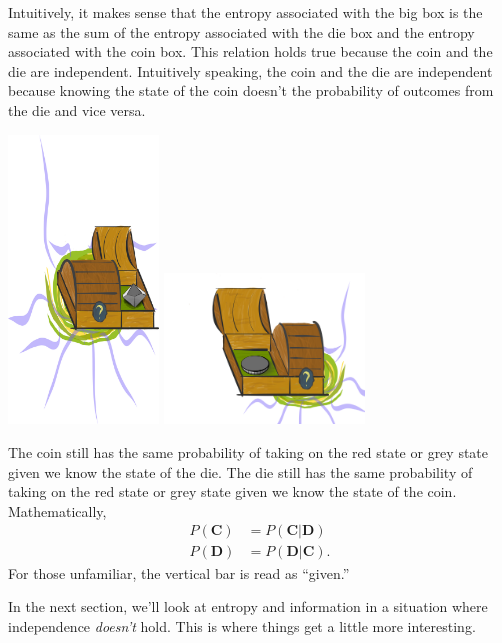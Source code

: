 Intuitively, it makes sense that the entropy associated with the big box is the same as the sum of the entropy associated with the die box and the entropy associated with the coin box.
This relation holds true because the coin and the die are independent.
Intuitively speaking, the coin and the die are independent because knowing the state of the coin doesn't the probability of outcomes from the die and vice versa.
\begin{center}

\includegraphics[width=0.3\textwidth]{img/left-box-closed-portal-die}
\includegraphics[trim= 0 -200ex 0 0, clip,width=0.4\textwidth]{img/right-box-closed-portal-coin}
\end{center}
The coin still has the same probability of taking on the red state or grey state given we know the state of the die.
The die still has the same probability of taking on the red state or grey state given we know the state of the coin.
Mathematically,
\begin{align*}
P(\bm{C}) &= P(\bm{C} | \bm{D}) \\
P(\bm{D}) &= P(\bm{D} | \bm{C}) .
\end{align*}
For those unfamiliar, the vertical bar is read as ``given.''

In the next section, we'll look at entropy and information in a situation where independence \textit{doesn't} hold.
This is where things get a little more interesting.
